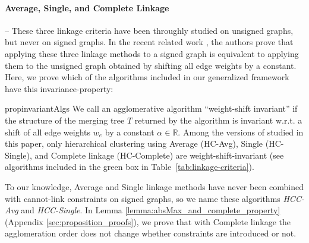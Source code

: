 \paragraph{Average, Single, and Complete Linkage} -- These three linkage criteria have been throughly studied on unsigned graphs, but never on signed graphs. In the recent related work \cite{chehreghani2020hierarchical}, the authors prove that applying these three linkage methods to a signed graph is equivalent to applying them to the unsigned graph obtained by shifting all edge weights by a constant.  Here, we prove which of the algorithms included in our generalized framework have this invariance-property:
\begin{restatable}{prop}{invariantAlgs}
\label{prop:weight_shift_invariant}
We call an agglomerative algorithm ``weight-shift invariant'' if the structure of the merging tree $T$ returned by the algorithm is invariant w.r.t. a shift of all edge weights $w_e$  by a constant $\alpha\in \mathbb{R}$. Among the versions of \algname{} studied in this paper, only hierarchical clustering using Average (HC-Avg), Single (HC-Single), and Complete linkage (HC-Complete) are weight-shift-invariant (see algorithms included in the green box in Table~\ref{tab:linkage-criteria}).
\end{restatable}
\noindent To our knowledge, Average and Single linkage methods have never been combined with cannot-link constraints on signed graphs, so we name these algorithms \emph{HCC-Avg} and \emph{HCC-Single}. In Lemma \ref{lemma:absMax_and_complete_property} (Appendix \ref{sec:proposition_proofs}), we prove that with Complete linkage the agglomeration order does not change whether constraints are introduced or not.










